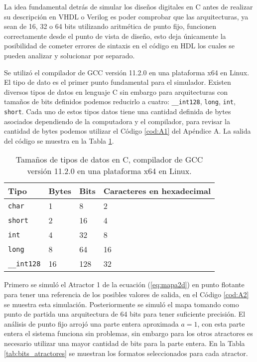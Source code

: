          La idea fundamental detrás de simular los diseños digitales en C antes de realizar su descripción en VHDL o Verilog es poder comprobar que las arquitecturas, ya sean de 16, 32 o 64 bits utilizando aritmética de punto fijo, funcionen correctamente desde el punto de vista de diseño, esto deja únicamente la posibilidad de cometer errores de sintaxis en el código en HDL los cuales se pueden analizar y solucionar por separado.

        Se utilizó el compilador de GCC versión 11.2.0 en una plataforma x64 en Linux. El tipo de dato es el primer punto fundamental para el simulador. Existen diversos tipos de datos en lenguaje C sin embargo para arquitecturas con tamaños de bits definidos podemos reducirlo a cuatro: \verb|__int128|, \verb|long|, \verb|int|, \verb|short|. Cada uno de estos tipos datos tiene una cantidad definida de bytes asociados dependiendo de la computadora y el compilador, para revisar la cantidad de bytes podemos utilizar el Código \ref{cod:A1} del Apéndice A. La salida del código se muestra en la Tabla \ref{tab:tipos_de_datos}.

        \begin{table}[htbp]
            \centering
            \caption{Tamaños de tipos de datos en C, compilador de GCC versión 11.2.0 en una plataforma x64 en Linux.}
            \begin{tabular}{|l|l|l|l|}
                \hline
                \rowcolor{lightgray} Tipo  & Bytes & Bits & Caracteres en hexadecimal\\
                \hline
                \verb|char|      & 1  & 8    & 2  \\
                \hline
                \verb|short|     & 2  & 16   & 4  \\
                \hline
                \verb|int|       & 4  & 32   & 8  \\
                \hline
                \verb|long|      & 8  & 64   & 16 \\
                \hline
                \verb|__int128|  & 16 & 128  & 32 \\
                \hline
            \end{tabular}
            \label{tab:tipos_de_datos}
        \end{table}
       
       Primero se simuló el Atractor 1 de la ecuación (\ref{eq:mapa2d}) en punto flotante para tener una referencia de los posibles valores de salida, en el Código \ref{cod:A2} se muestra esta simulación. Posteriormente se simuló el mapa tomando como punto de partida una arquitectura de 64 bits para tener suficiente precisión. El análisis de punto fijo arrojó una parte entera aproximada $a = 1$, con esta parte entera el sistema funciona sin problemas, sin embargo para los otros atractores es necesario utilizar una mayor cantidad de bits para la parte entera. En la Tabla \ref{tab:bits_atractores} se muestran los formatos seleccionados para cada atractor.
  
